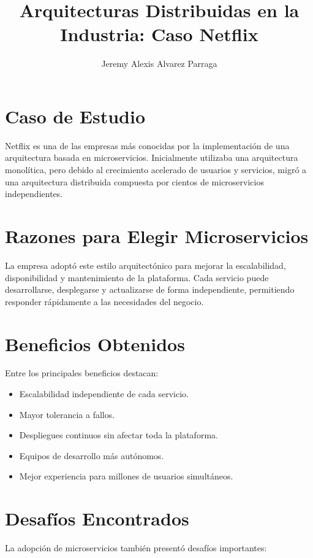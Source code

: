 \documentclass[12pt]{article}
\title{Arquitecturas Distribuidas en la Industria: Caso Netflix}
\author{Jeremy Alexis Alvarez Parraga}
\date{}
\begin{document}
\maketitle

\section{Caso de Estudio}

Netflix es una de las empresas más conocidas por la implementación de una arquitectura basada en microservicios. Inicialmente utilizaba una arquitectura monolítica, pero debido al crecimiento acelerado de usuarios y servicios, migró a una arquitectura distribuida compuesta por cientos de microservicios independientes.

\section{Razones para Elegir Microservicios}

La empresa adoptó este estilo arquitectónico para mejorar la escalabilidad, disponibilidad y mantenimiento de la plataforma. Cada servicio puede desarrollarse, desplegarse y actualizarse de forma independiente, permitiendo responder rápidamente a las necesidades del negocio.

\section{Beneficios Obtenidos}

Entre los principales beneficios destacan:

\begin{itemize}
\item Escalabilidad independiente de cada servicio.
\item Mayor tolerancia a fallos.
\item Despliegues continuos sin afectar toda la plataforma.
\item Equipos de desarrollo más autónomos.
\item Mejor experiencia para millones de usuarios simultáneos.
\end{itemize}

\section{Desafíos Encontrados}

La adopción de microservicios también presentó desafíos importantes:
\end{document}
